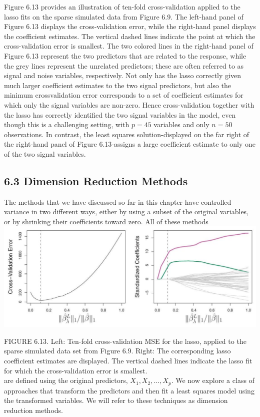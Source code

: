 \documentclass[10pt]{article}
\begin{document}
Figure 6.13 provides an illustration of ten-fold cross-validation applied to the lasso fits on the sparse simulated data from Figure 6.9. The left-hand panel of Figure 6.13 displays the cross-validation error, while the right-hand panel displays the coefficient estimates. The vertical dashed lines indicate the point at which the cross-validation error is smallest. The two colored lines in the right-hand panel of Figure 6.13 represent the two predictors that are related to the response, while the grey lines represent the unrelated predictors; these are often referred to as signal and noise variables, respectively. Not only has the lasso correctly given much larger coefficient estimates to the two signal predictors, but also the minimum crossvalidation error corresponds to a set of coefficient estimates for which only the signal variables are non-zero. Hence cross-validation together with the lasso has correctly identified the two signal variables in the model, even though this is a challenging setting, with $p=45$ variables and only $n=50$ observations. In contrast, the least squares solution-displayed on the far right of the right-hand panel of Figure 6.13-assigns a large coefficient estimate to only one of the two signal variables.

\subsection*{6.3 Dimension Reduction Methods}
The methods that we have discussed so far in this chapter have controlled variance in two different ways, either by using a subset of the original variables, or by shrinking their coefficients toward zero. All of these methods\\
\includegraphics[max width=\textwidth, center]{2025_05_05_efe77898333945044de4g-244}

FIGURE 6.13. Left: Ten-fold cross-validation MSE for the lasso, applied to the sparse simulated data set from Figure 6.9. Right: The corresponding lasso coefficient estimates are displayed. The vertical dashed lines indicate the lasso fit for which the cross-validation error is smallest.\\
are defined using the original predictors, $X_{1}, X_{2}, \ldots, X_{p}$. We now explore a class of approaches that transform the predictors and then fit a least squares model using the transformed variables. We will refer to these techniques as dimension reduction methods.
\end{document}
